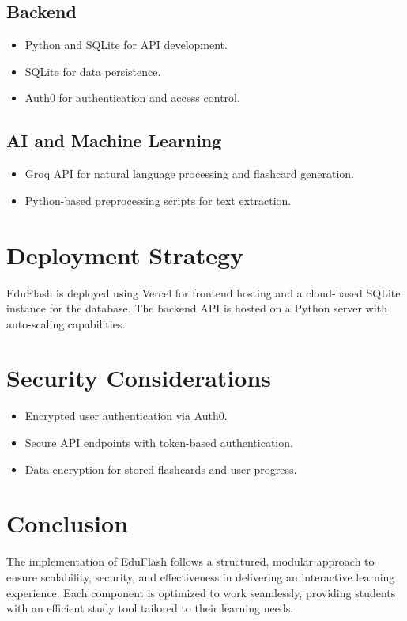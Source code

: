 \documentclass{report}
\begin{document}
\subsection{Backend}
\begin{itemize}
    \item Python and SQLite for API development.
    \item SQLite for data persistence.
    \item Auth0 for authentication and access control.
\end{itemize}

\subsection{AI and Machine Learning}
\begin{itemize}
    \item Groq API for natural language processing and flashcard generation.
    \item Python-based preprocessing scripts for text extraction.
\end{itemize}

\section{Deployment Strategy}
EduFlash is deployed using Vercel for frontend hosting and a cloud-based SQLite instance for the database. The backend API is hosted on a Python server with auto-scaling capabilities.

\section{Security Considerations}
\begin{itemize}
    \item Encrypted user authentication via Auth0.
    \item Secure API endpoints with token-based authentication.
    \item Data encryption for stored flashcards and user progress.
\end{itemize}

\section{Conclusion}
The implementation of EduFlash follows a structured, modular approach to ensure scalability, security, and effectiveness in delivering an interactive learning experience. Each component is optimized to work seamlessly, providing students with an efficient study tool tailored to their learning needs.
\end{document}
